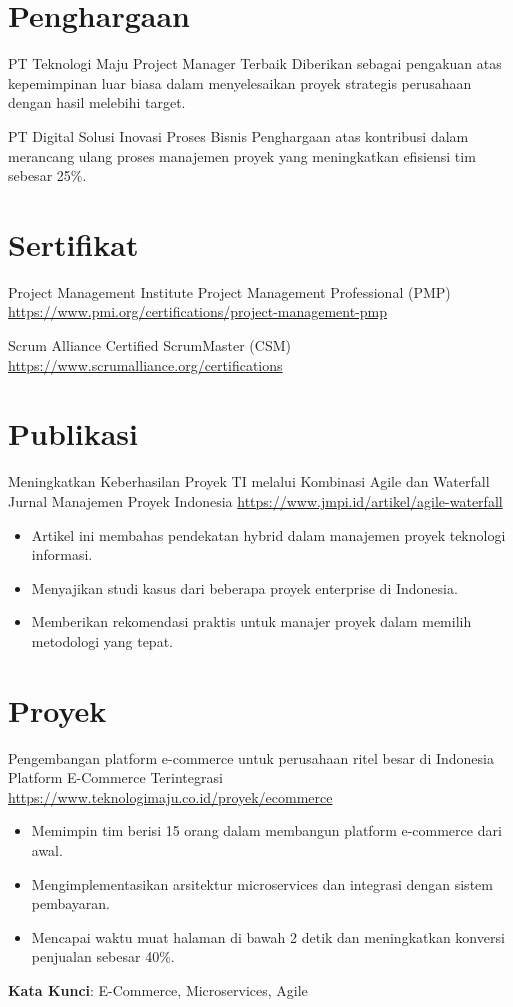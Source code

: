 \documentclass[a4paper, serif, 10pt]{moderncv}
\begin{document}
\section{Penghargaan}

        {PT Teknologi Maju}
        {Project Manager Terbaik}
        {}
        {}
        {Diberikan sebagai pengakuan atas kepemimpinan luar biasa dalam menyelesaikan proyek strategis perusahaan dengan hasil melebihi target.}

        {PT Digital Solusi}
        {Inovasi Proses Bisnis}
        {}
        {}
        {Penghargaan atas kontribusi dalam merancang ulang proses manajemen proyek yang meningkatkan efisiensi tim sebesar 25\%.}
\section{Sertifikat}

        {Project Management Institute}
        {Project Management Professional (PMP)}
        {\url{https://www.pmi.org/certifications/project-management-pmp}}
        {}
        {}

        {Scrum Alliance}
        {Certified ScrumMaster (CSM)}
        {\url{https://www.scrumalliance.org/certifications}}
        {}
        {}
\section{Publikasi}

        {Meningkatkan Keberhasilan Proyek TI melalui Kombinasi Agile dan Waterfall}
        {Jurnal Manajemen Proyek Indonesia}
        {\url{https://www.jmpi.id/artikel/agile-waterfall}}
        {}
        {\begin{itemize}
\item Artikel ini membahas pendekatan hybrid dalam manajemen proyek teknologi informasi.
\item Menyajikan studi kasus dari beberapa proyek enterprise di Indonesia.
\item Memberikan rekomendasi praktis untuk manajer proyek dalam memilih metodologi yang tepat.
\end{itemize}}
\section{Proyek}

        {Pengembangan platform e-commerce untuk perusahaan ritel besar di Indonesia}
        {Platform E-Commerce Terintegrasi}
        {\url{https://www.teknologimaju.co.id/proyek/ecommerce}}
        {}
        {\begin{itemize}
\item Memimpin tim berisi 15 orang dalam membangun platform e-commerce dari awal.
\item Mengimplementasikan arsitektur microservices dan integrasi dengan sistem pembayaran.
\item Mencapai waktu muat halaman di bawah 2 detik dan meningkatkan konversi penjualan sebesar 40\%.
\end{itemize}
\textbf{Kata Kunci}: E-Commerce, Microservices, Agile}
\end{document}
